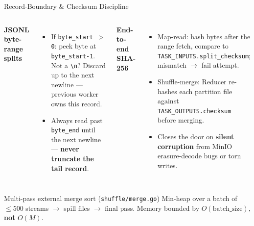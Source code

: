 \documentclass[11pt]{beamer}
\begin{document}
\begin{frame}{Record-Boundary \& Checksum Discipline}
\begin{columns}[T]
\textbf{JSONL byte-range splits}
\begin{itemize}\scriptsize
  \item If \texttt{byte\_start $>$ 0}: peek byte at \texttt{byte\_start-1}.
        Not a \texttt{\textbackslash n}? Discard up to the next newline ---
        previous worker owns this record.
  \item Always read \alert{past} \texttt{byte\_end} until the next newline ---
        \textbf{never truncate the tail record}.
\end{itemize}

\textbf{End-to-end SHA-256}
\begin{itemize}\scriptsize
  \item \alert{Map-read}: hash bytes after the range fetch,
        compare to \texttt{TASK\_INPUTS.split\_checksum}; mismatch $\to$ fail attempt.
  \item \alert{Shuffle-merge}: Reducer re-hashes each partition file
        against \texttt{TASK\_OUTPUTS.checksum} before merging.
  \item Closes the door on \textbf{silent corruption} from MinIO erasure-decode bugs
        or torn writes.
\end{itemize}
\end{columns}

\vspace{0.5em}
\begin{block}{Multi-pass external merge sort (\texttt{shuffle/merge.go})}
Min-heap over a batch of $\le 500$ streams $\to$ spill files $\to$ final pass.
Memory bounded by $O(\text{batch\_size})$, \textbf{not} $O(M)$.
\end{block}
\end{frame}
\end{document}
